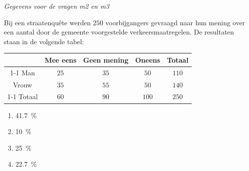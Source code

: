 \textit{Gegevens voor de vragen m2 en m3}

\noindent Bij een straatenquête werden $250$ voorbijgangers gevraagd naar hun mening over een aantal door de gemeente voorgestelde verkeersmaatregelen.
De resultaten staan in de volgende tabel:

\begin{center}
    \begin{tabular}{ccccc}
        \toprule
            & \textbf{Mee eens} & \textbf{Geen mening} & \textbf{Oneens} & \textbf{Totaal} \\
        \cmidrule{1-1} \cmidrule{2-2} \cmidrule{3-3} \cmidrule{4-4} \cmidrule{5-5} 
            Man & $25$ & $35$ & $50$ & $110$ \\
            Vrouw & $35$ & $55$ & $50$ & $140$ \\
        \cmidrule{1-1} \cmidrule{2-2} \cmidrule{3-3} \cmidrule{4-4} \cmidrule{5-5}
            Totaal & $60$ & $90$ & $100$ & $250$ \\
        \bottomrule
    \end{tabular}
\end{center}

\begin{enumerate}[label=(\alph*)]
    \item \SI{41.7}{\percent}
    \item \SI{10}{\percent}
    \item \SI{25}{\percent}
    \item \SI{22.7}{\percent}
\end{enumerate}
